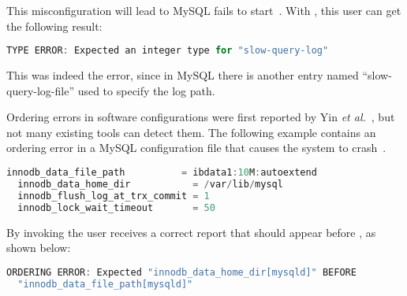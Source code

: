 This misconfiguration will lead to 
MySQL fails to start~\cite{querylog}. With \app, this user can get the following result:

\begin{lstlisting}[language=C, xleftmargin=.01\textwidth]
TYPE ERROR: Expected an integer type for "slow-query-log"
\end{lstlisting} 
This was indeed the error, since in MySQL there is another entry 
named ``slow-query-log-file'' used to specify the log path.

Ordering errors in software configurations were first reported by 
Yin {\em et al.}~\cite{yin11anempirical}, but not many existing tools
can detect them. The following example
contains an ordering error in a MySQL configuration file
that causes the system to crash~\cite{innod-ordering}. 
\begin{lstlisting}[language=C, xleftmargin=.01\textwidth]
  innodb_data_file_path          = ibdata1:10M:autoextend
  innodb_data_home_dir           = /var/lib/mysql
  innodb_flush_log_at_trx_commit = 1
  innodb_lock_wait_timeout       = 50
\end{lstlisting}

By invoking \app  the user receives a correct report that  
should appear before , as shown
below:
 \begin{lstlisting}[language=C, xleftmargin=.01\textwidth]
ORDERING ERROR: Expected "innodb_data_home_dir[mysqld]" BEFORE
  "innodb_data_file_path[mysqld]" 
\end{lstlisting} 


